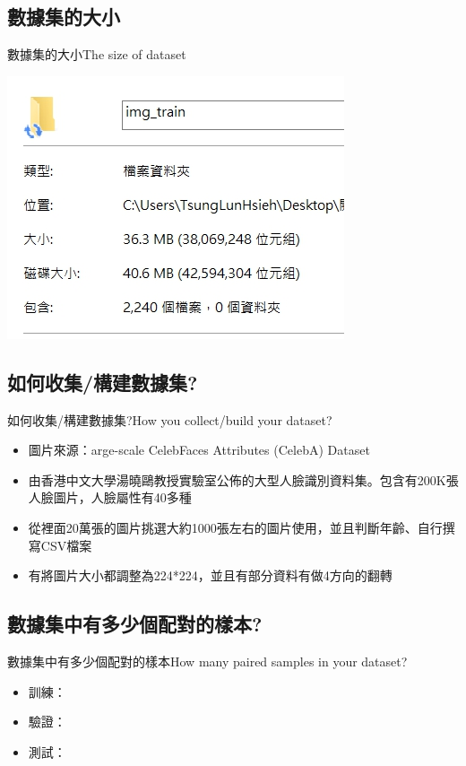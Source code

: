 \documentclass[utf8x]{beamer}
\begin{document}
\subsection{數據集的大小}
\begin{frame}{數據集的大小}{The size of  dataset}
\begin{minipage}[c][0.4\textheight][c]{\linewidth}
                \centering
                \includegraphics[width=0.5\linewidth]{1561052804594.jpg}
            \end{minipage}
\end{frame}
\subsection{如何收集/構建數據集?}
\begin{frame}{如何收集/構建數據集?}{How you collect/build your dataset?}
  \begin{itemize}
  \item {
    圖片來源：arge-scale CelebFaces Attributes (CelebA) Dataset
  }
  \item {
    由香港中文大學湯曉鷗教授實驗室公佈的大型人臉識別資料集。包含有200K張人臉圖片，人臉屬性有40多種
  }
 \item {
    從裡面20萬張的圖片挑選大約1000張左右的圖片使用，並且判斷年齡、自行撰寫CSV檔案
  }
 \item {
    有將圖片大小都調整為224*224，並且有部分資料有做4方向的翻轉
  }
  \end{itemize}
\end{frame}
\subsection{數據集中有多少個配對的樣本?}
\begin{frame}{數據集中有多少個配對的樣本}{How many paired samples in your dataset?}
  \begin{itemize}
  \item {
    訓練：
  }
  \item {
    驗證：
  }
 \item {
    測試：
  }
  \end{itemize}
\end{frame}
\end{document}

